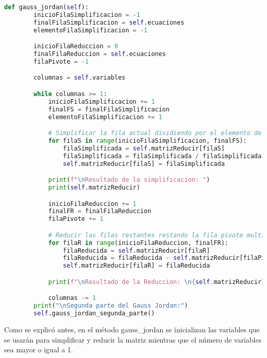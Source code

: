 \documentclass[letterpaper,12pt]{article}
\begin{document}
\begin{lstlisting}[style=jupyter, language=Python, caption={Método para resolver el sistema de ecuaciones}]
    def gauss_jordan(self):
        inicioFilaSimplificacion = -1
        finalFilaSimplificacion = self.ecuaciones
        elementoFilaSimplificacion = -1

        inicioFilaReduccion = 0
        finalFilaReduccion = self.ecuaciones
        filaPivote = -1

        columnas = self.variables

        while columnas >= 1:
            inicioFilaSimplificacion += 1
            finalFS = finalFilaSimplificacion
            elementoFilaSimplificacion += 1

            # Simplificar la fila actual dividiendo por el elemento de la columna correspondiente
            for filaS in range(inicioFilaSimplificacion, finalFS):
                filaSimplificada = self.matrizReducir[filaS]
                filaSimplificada = filaSimplificada / filaSimplificada[elementoFilaSimplificacion]
                self.matrizReducir[filaS] = filaSimplificada

            print(f"\nResultado de la simplificacion: ")
            print(self.matrizReducir)

            inicioFilaReduccion += 1
            finalFR = finalFilaReduccion
            filaPivote += 1

            # Reducir las filas restantes restando la fila pivote multiplicada por el elemento correspondiente
            for filaR in range(inicioFilaReduccion, finalFR):
                filaReducida = self.matrizReducir[filaR]
                filaReducida = filaReducida - self.matrizReducir[filaPivote]
                self.matrizReducir[filaR] = filaReducida

            print(f"\nResultado de la Reduccion: \n{self.matrizReducir}")

            columnas -= 1
        print("\nSegunda parte del Gauss Jordan:")
        self.gauss_jordan_segunda_parte()

\end{lstlisting}
Como se explicó antes, en el método \textcolor{jl_keyword}{gauss\_jordan} se inicializan las variables que se usarán para simplificar y reducir la matriz mientras que el número de variables sea mayor o igual a 1.
\end{document}
